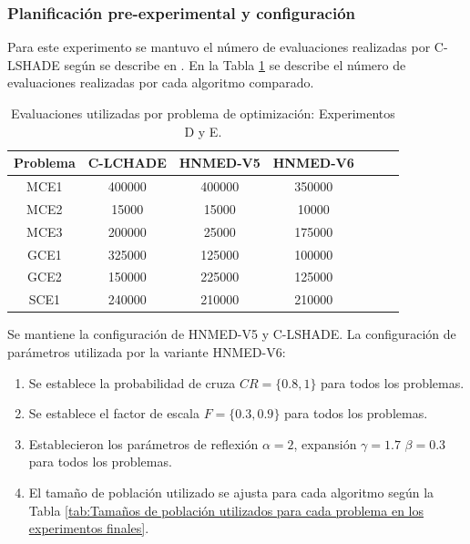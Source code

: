 \subsubsection{Planificación pre-experimental y configuración}
Para este experimento se mantuvo el número de evaluaciones realizadas por C-LSHADE según se describe en \cite{zapata_zapata_control_2017}. En la Tabla \ref{tab:Evaluaciones utilizadas por problema de optimización: Experimentos D y E.} se describe el número de evaluaciones realizadas por cada algoritmo comparado.

\begin{table}[]
	
	\caption{Evaluaciones utilizadas por problema de optimización: Experimentos D y E.}
	\label{tab:Evaluaciones utilizadas por problema de optimización: Experimentos D y E.}
	\centering
	
	\begin{tabular}{ccccccc}
		\textbf{Problema} &   C-LCHADE     &HNMED-V5&HNMED-V6 \\
		\hline
		MCE1   &   400000 &400000 &350000   \\
		MCE2   &   15000  &15000  &10000   \\
		MCE3   &   200000 &25000  &175000  \\
		GCE1   &   325000 &125000  &100000\\
		GCE2   &   150000 &225000  &125000\\
		SCE1   &   240000 &210000  &210000\\
	\end{tabular}
	
\end{table}
Se mantiene la configuración de HNMED-V5 y C-LSHADE. La configuración de parámetros utilizada por la variante HNMED-V6:
\begin{enumerate}
	\item Se establece la probabilidad de cruza $CR=\{0.8, 1\}$  para todos los problemas.
	\item Se establece el factor de escala $F=\{0.3, 0.9\}$ para todos los problemas.
	\item Establecieron los parámetros de reflexión $\alpha=2$, expansión $\gamma=1.7$ $\beta=0.3$ para todos los problemas.
	\item El tamaño de población utilizado se ajusta para cada algoritmo según la Tabla \ref{tab:Tamaños de población utilizados para cada problema en los experimentos finales}. 
\end{enumerate}

